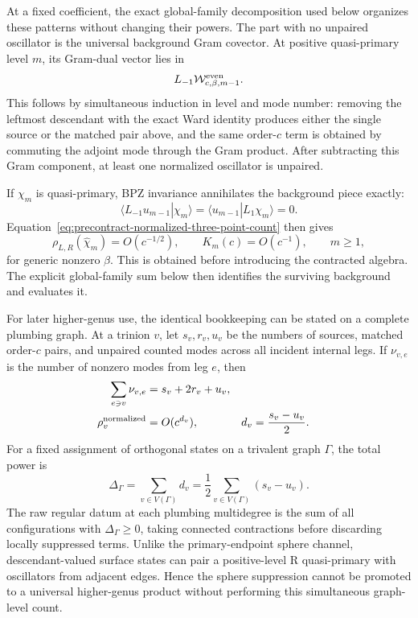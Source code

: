 \documentclass[11pt]{article}
\begin{document}
At a fixed coefficient, the exact global-family decomposition used below
organizes these patterns without changing their powers.  The part with no
unpaired oscillator is the universal background Gram covector.  At positive
quasi-primary level \(m\), its Gram-dual vector lies in
\begin{equation}
 L_{-1}\mathcal W^{\rm even}_{c,\beta,m-1}.
 \label{eq:precontract-background-image}
\end{equation}
This follows by simultaneous induction in level and mode number: removing
the leftmost descendant with the exact Ward identity produces either the
single source or the matched pair above, and the same order-\(c\) term is
obtained by commuting the adjoint mode through the Gram product.  After
subtracting this Gram component, at least one normalized oscillator is
unpaired.

If \(\chi_m\) is quasi-primary, BPZ invariance annihilates the background
piece exactly:
\begin{equation}
 \langle L_{-1}u_{m-1}|\chi_m\rangle
 =\langle u_{m-1}|L_1\chi_m\rangle=0.
 \label{eq:precontract-background-annihilation}
\end{equation}
Equation~\eqref{eq:precontract-normalized-three-point-count} then gives
\begin{equation}
 \rho_{L,R}(\widehat\chi_m)=O(c^{-1/2}),
 \qquad
 K_m(c)=O(c^{-1}),
 \qquad m\geq1,
 \label{eq:precontract-positive-family-suppression}
\end{equation}
for generic nonzero \(\beta\).  This is obtained before introducing the
contracted algebra.  The explicit global-family sum below then identifies
the surviving background and evaluates it.

For later higher-genus use, the identical bookkeeping can be stated on a
complete plumbing graph.  At a trinion \(v\), let \(s_v,r_v,u_v\) be the
numbers of sources, matched order-\(c\) pairs, and unpaired counted modes
across all incident internal legs.  If \(\nu_{v,e}\) is the number of nonzero modes
from leg \(e\), then
\begin{align}
 \sum_{e\ni v}\nu_{v,e}&=s_v+2r_v+u_v,
 \notag\\
 \rho_v^{\rm normalized}&=O(c^{d_v}),
 &d_v&=\frac{s_v-u_v}{2}.
 \label{eq:precontract-vertex-power}
\end{align}
For a fixed assignment of orthogonal states on a trivalent graph
\(\Gamma\), the total power is
\begin{equation}
 \boxed{
 \Delta_\Gamma
 =\sum_{v\in V(\Gamma)}d_v
 =\frac12\sum_{v\in V(\Gamma)}(s_v-u_v).}
 \label{eq:precontract-graph-power}
\end{equation}
The raw regular datum at each plumbing multidegree is the sum of all
configurations with \(\Delta_\Gamma\geq0\), taking connected contractions
before discarding locally suppressed terms.  Unlike the primary-endpoint
sphere channel, descendant-valued surface states can pair a positive-level
R quasi-primary with oscillators from adjacent edges.  Hence the sphere
suppression cannot be promoted to a universal higher-genus product without
performing this simultaneous graph-level count.
\end{document}
